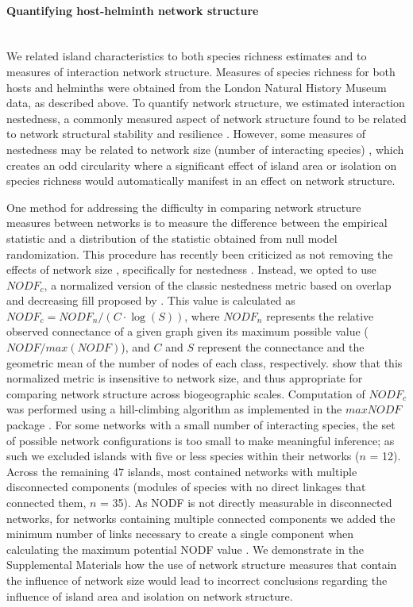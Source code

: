 \paragraph*{Quantifying host-helminth network structure}\mbox{}\\ 
We related island characteristics to both species richness estimates and to measures of interaction network structure. Measures of species richness for both hosts and helminths were obtained from the London Natural History Museum data, as described above. To quantify network structure, we estimated interaction nestedness, a commonly measured aspect of network structure found to be related to network structural stability \parencite{thebault2010stability, dallas2015co, valdovinos2019mutualistic} and resilience \parencite{thebault2010stability, suweis2013emergence}. However, some measures of nestedness may be related to network size (number of interacting species) \parencite{bascompte2003nested, nielsen2007ecological}, which creates an odd circularity where a significant effect of island area or isolation on species richness would automatically manifest in an effect on network structure. 


One method for addressing the difficulty in comparing network structure measures between networks is to measure the difference between the empirical statistic and a distribution of the statistic obtained from null model randomization. This procedure has recently been criticized as not removing the effects of network size \parencite{chagnon2015}, specifically for nestedness \parencite{strona2014, song2017some}. Instead, we opted to use $NODF_c$, a normalized version of the classic nestedness metric based on overlap and decreasing fill proposed by \citet{song2017some}. This value is calculated as $NODF_c = NODF_n/(C\cdot \log(S))$, where $NODF_n$ represents the relative observed connectance of a given graph given its maximum possible value ($NODF/max(NODF)$), and $C$ and $S$ represent the connectance and the geometric mean of the number of nodes of each class, respectively. \citet{song2017some} show that this normalized metric is insensitive to network size, and thus appropriate for comparing network structure across biogeographic scales. Computation of $NODF_c$ was performed using a hill-climbing algorithm as implemented in the $maxNODF$ package \parencite{hoeppke2021maxnodf}. For some networks with a small number of interacting species, the set of possible network configurations is too small to make meaningful inference; as such we excluded islands with five or less species within their networks ($n$ = 12). Across the remaining 47 islands, most contained networks with multiple disconnected components (modules of species with no direct linkages that connected them, $n$ = 35). As NODF is not directly measurable in disconnected networks, for networks containing multiple connected components we added the minimum number of links necessary to create a single component when calculating the maximum potential NODF value \parencite{hoeppke2021maxnodf}. We demonstrate in the Supplemental Materials how the use of network structure measures that contain the influence of network size would lead to incorrect conclusions regarding the influence of island area and isolation on network structure. 

